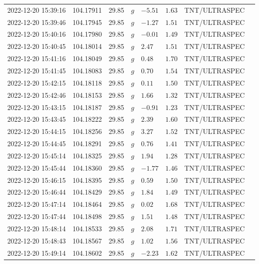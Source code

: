 \documentclass{nature_plusfigure}
\begin{document}
\begin{supplement}
\begin{center}
\begin{longtable}{llllllll}
2022-12-20 15:39:16 & 104.17911 & 29.85 & $g$ & $-5.51$ & $1.63$ & TNT/ULTRASPEC &  \\ 
2022-12-20 15:39:46 & 104.17945 & 29.85 & $g$ & $-1.27$ & $1.51$ & TNT/ULTRASPEC &  \\ 
2022-12-20 15:40:16 & 104.17980 & 29.85 & $g$ & $-0.01$ & $1.49$ & TNT/ULTRASPEC &  \\ 
2022-12-20 15:40:45 & 104.18014 & 29.85 & $g$ & $2.47$ & $1.51$ & TNT/ULTRASPEC &  \\ 
2022-12-20 15:41:16 & 104.18049 & 29.85 & $g$ & $0.48$ & $1.70$ & TNT/ULTRASPEC &  \\ 
2022-12-20 15:41:45 & 104.18083 & 29.85 & $g$ & $0.70$ & $1.54$ & TNT/ULTRASPEC &  \\ 
2022-12-20 15:42:15 & 104.18118 & 29.85 & $g$ & $0.11$ & $1.50$ & TNT/ULTRASPEC &  \\ 
2022-12-20 15:42:46 & 104.18153 & 29.85 & $g$ & $1.66$ & $1.32$ & TNT/ULTRASPEC &  \\ 
2022-12-20 15:43:15 & 104.18187 & 29.85 & $g$ & $-0.91$ & $1.23$ & TNT/ULTRASPEC &  \\ 
2022-12-20 15:43:45 & 104.18222 & 29.85 & $g$ & $2.39$ & $1.60$ & TNT/ULTRASPEC &  \\ 
2022-12-20 15:44:15 & 104.18256 & 29.85 & $g$ & $3.27$ & $1.52$ & TNT/ULTRASPEC &  \\ 
2022-12-20 15:44:45 & 104.18291 & 29.85 & $g$ & $0.76$ & $1.41$ & TNT/ULTRASPEC &  \\ 
2022-12-20 15:45:14 & 104.18325 & 29.85 & $g$ & $1.94$ & $1.28$ & TNT/ULTRASPEC &  \\ 
2022-12-20 15:45:44 & 104.18360 & 29.85 & $g$ & $-1.77$ & $1.46$ & TNT/ULTRASPEC &  \\ 
2022-12-20 15:46:15 & 104.18395 & 29.85 & $g$ & $0.59$ & $1.50$ & TNT/ULTRASPEC &  \\ 
2022-12-20 15:46:44 & 104.18429 & 29.85 & $g$ & $1.84$ & $1.49$ & TNT/ULTRASPEC &  \\ 
2022-12-20 15:47:14 & 104.18464 & 29.85 & $g$ & $0.02$ & $1.68$ & TNT/ULTRASPEC &  \\ 
2022-12-20 15:47:44 & 104.18498 & 29.85 & $g$ & $1.51$ & $1.48$ & TNT/ULTRASPEC &  \\ 
2022-12-20 15:48:14 & 104.18533 & 29.85 & $g$ & $2.08$ & $1.71$ & TNT/ULTRASPEC &  \\ 
2022-12-20 15:48:43 & 104.18567 & 29.85 & $g$ & $1.02$ & $1.56$ & TNT/ULTRASPEC &  \\ 
2022-12-20 15:49:14 & 104.18602 & 29.85 & $g$ & $-2.23$ & $1.62$ & TNT/ULTRASPEC &  \\ 

\end{longtable}
\end{center}
\end{supplement}
\end{document}
